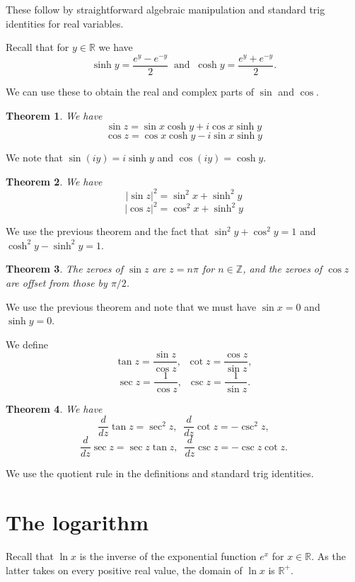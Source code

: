 \documentclass[a4paper,10pt]{article}
\newcommand{\Z}{\mathbb{Z}}
\newcommand{\R}{\mathbb{R}}
\newtheorem{theorem}{Theorem}[section]
\newenvironment{definition}[1][Definition]{\begin{trivlist}
\item[\hskip \labelsep {\bfseries #1}]}{\end{trivlist}}
\begin{document}
These follow by straightforward algebraic manipulation and standard trig identities for real variables.

Recall that for $y \in \R$ we have
$$\sinh y = \frac{e^y - e^{-y}}{2} \;\;\mbox{and}\;\; \cosh y = \frac{e^y + e^{-y}}{2}.$$

We can use these to obtain the real and complex parts of $\sin$ and $\cos$.

\begin{theorem}
We have
$$\sin z = \sin x\cosh y + i\cos x \sinh y$$
$$\cos z = \cos x\cosh y - i\sin x \sinh y$$
\end{theorem}

We note that $\sin(iy) = i\sinh y$ and $\cos(iy) = \cosh y$.

\begin{theorem}
We have
$$|\sin z|^2 = \sin^2 x + \sinh^2 y$$
$$|\cos z|^2 = \cos^2 x + \sinh^2 y$$
\end{theorem}

We use the previous theorem and the fact that $\sin^2 y + \cos^2 y = 1$ and $\cosh^2 y - \sinh^2 y = 1$.

\begin{theorem}
The zeroes of $\sin z$ are $z = n\pi$ for $n \in \Z$, and the zeroes of $\cos z$ are offset from those by $\pi/2$.
\end{theorem}

We use the previous theorem and note that we must have $\sin x = 0$ and $\sinh y = 0$.

\begin{definition}
We define
$$\tan z = \frac{\sin z}{\cos z}, \;\; \cot z = \frac{\cos z}{\sin z},$$
$$\sec z = \frac{1}{\cos z}, \;\; \csc z = \frac{1}{\sin z}.$$
\end{definition}

\begin{theorem}
We have
$$\frac{d}{dz}\tan z = \sec^2 z, \;\; \frac{d}{dz}\cot z = -\csc^2 z,$$
$$\frac{d}{dz}\sec z = \sec z\tan z, \;\; \frac{d}{dz}\csc z = -\csc z\cot z.$$
\end{theorem}

We use the quotient rule in the definitions and standard trig identities.

\section{The logarithm}

Recall that $\ln x$ is the inverse of the exponential function $e^x$ for $x \in \R$. As the latter takes on every positive real value, the domain of $\ln x$ is $\R^{+}$.
\end{document}
